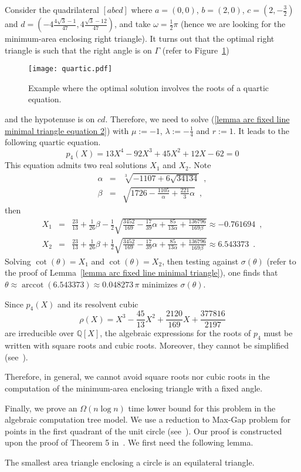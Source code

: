 \documentclass[11pt, oneside]{article}
\DeclareMathOperator{\arccot}{arccot}
\begin{document}
Consider the quadrilateral $[abcd]$ where
$a=(0,0)$,
$b=(2,0)$,
$c=\left(2,-\frac{3}{2}\right)$
and $d=\left(-4\frac{4\sqrt{3}-1}{47},4\frac{\sqrt{3}-12}{47}\right)$,
and take $\omega=\frac{1}{2}\pi$
(hence we are looking for the minimum-area enclosing right triangle).
It turns out that the optimal right triangle
is such that the right angle is on $\Gamma$
(refer to Figure~\ref{figure quartic})
\begin{figure}
\centering
\texttt{[image: quartic.pdf]}
\caption{Example where the optimal solution involves the roots of a quartic equation.\label{figure quartic}}
\end{figure}
and the hypotenuse is on $cd$.
Therefore, 
we need to solve (\ref{lemma arc fixed line minimal triangle equation 2})
with $\mu:=-1$,
$\lambda:=-\frac{1}{4}$
and $r:=1$.
It leads to the following quartic equation.
$$p_4(X)=13X^4-92X^3+45X^2+12X-62=0$$
This equation admits two real solutions $X_1$ and $X_2$.
Note 
\begin{eqnarray*}
\alpha &=& \sqrt[3]{-1107+6\sqrt{34134}} \enspace,\\
\beta &=& \sqrt{1726-\frac{1105}{\alpha}+\frac{221}{3}\alpha} \enspace,
\end{eqnarray*}
then
\begin{eqnarray*}
X_1 &=& \frac{23}{13}+\frac{1}{26}\beta-\frac{1}{2}\sqrt{\frac{3452}{169}-\frac{17}{39}\alpha+\frac{85}{13\alpha}+\frac{136796}{169\beta}}\approx -0.761694 \enspace,\\
X_2 &=& \frac{23}{13}+\frac{1}{26}\beta+\frac{1}{2}\sqrt{\frac{3452}{169}-\frac{17}{39}\alpha+\frac{85}{13\alpha}+\frac{136796}{169\beta}}\approx 6.543373 \enspace.
\end{eqnarray*}
Solving $\cot(\theta)=X_1$
and $\cot(\theta)=X_2$,
then testing against $\sigma(\theta)$
(refer to the proof of Lemma~\ref{lemma arc fixed line minimal triangle}),
one finds that $\theta \approx \arccot(6.543373) \approx 0.048273\,\pi$
minimizes $\sigma(\theta)$.

Since $p_4(X)$ and its resolvent cubic
$$\rho(X)=X^3-\frac{45}{13}X^2+\frac{2120}{169}X+\frac{377816}{2197}$$
are irreducible over $\mathbb{Q}[X]$,
the algebraic expressions for the roots of $p_4$ must be written 
with square roots and cubic roots.
Moreover,
they cannot be simplified (see~\cite{dummit}).

Therefore, 
in general, 
we cannot avoid square roots
nor cubic roots in
the computation of the minimum-area enclosing triangle
with a fixed angle.

Finally,
we prove an $\Omega(n\log n)$ time lower bound for this problem
in the algebraic computation tree model.
We use a reduction to Max-Gap problem for points in the first quadrant
of the unit circle (see~\cite{DBLP:journals/algorithmica/LeeW86}).
Our proof is constructed upon the proof of Theorem 5 in~\cite{DBLP:journals/ijcga/BoseMSS11}.
We first need the following lemma.
\begin{lemma}
\label{lemma smallest triangle circle}
The smallest area triangle enclosing a circle is an equilateral triangle.
\end{lemma}
\end{document}
